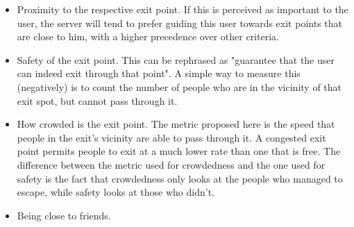 \begin{itemize}
  \item Proximity to the respective exit point. If this is perceived as
    important to the user, the server will tend to prefer guiding this user
    towards exit points that are close to him, with a higher precedence over
    other criteria.
  \item Safety of the exit point. This can be rephrased as "guarantee that
    the user can indeed exit through that point". A simple way to measure this
    (negatively) is to count the number of people who are in the vicinity of
    that exit spot, but cannot pass through it.
  \item How crowded is the exit point. The metric proposed here is the speed
    that people in the exit's vicinity are able to pass through it. A
    congested exit point permits people to exit at a much lower rate than one
    that is free. The difference between the metric used for crowdedness and
    the one used for safety is the fact that crowdedness only looks at the
    people who managed to escape, while safety looks at those who didn't.
  \item Being close to friends.
\end{itemize}
